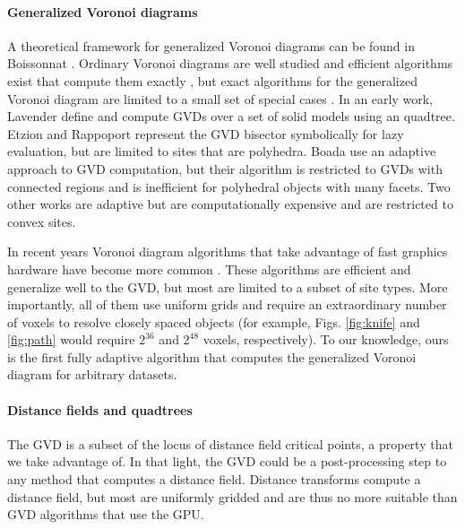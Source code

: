 \documentclass[submission]{gmp2017}
\begin{document}
\paragraph{Generalized Voronoi diagrams}
A theoretical framework for generalized Voronoi diagrams can be found in Boissonnat \etal {}. Ordinary Voronoi diagrams are well studied and efficient algorithms exist that compute them exactly \cite{de2008computational}, but exact algorithms for the generalized Voronoi diagram are limited to a small set of special cases \cite{lee1982medial,karavelas2004robust}. In an early work, Lavender \etal {} define and compute GVDs over a set of solid models using an quadtree.  Etzion and Rappoport  represent the GVD bisector symbolically for lazy evaluation, but are limited to sites that are polyhedra.  Boada \etal {} use an adaptive approach to GVD computation, but their algorithm is restricted to GVDs with connected regions and is inefficient for polyhedral objects with many facets.  Two other works are adaptive \cite{teichmann1997polygonal,vleugels1998approximating} but are computationally expensive and are restricted to convex sites.

In recent years Voronoi diagram algorithms that take advantage of fast graphics hardware have become more common \cite{cao2010parallel,fischer2006fast,hsieh2005simple,rong2007variants,sud2006interactive,sud2006fast,hoff1999fast,wu2008gpu}.  These algorithms are efficient and generalize well to the GVD, but most are limited to a subset of site types.  More importantly, all of them use uniform grids and require an extraordinary number of voxels to resolve closely spaced objects (for example, Figs. \ref{fig:knife} and \ref{fig:path} would require $2^{36}$ and $2^{48}$ voxels, respectively).  To our knowledge, ours is the first fully adaptive algorithm that computes the generalized Voronoi diagram for arbitrary datasets.

\paragraph{Distance fields and quadtrees}
The GVD is a subset of the locus of distance field critical points, a property that we take advantage of. In that light, the GVD could be a post-processing step to any method that computes a distance field.  Distance transforms compute a distance field, but most are uniformly gridded \cite{jones20063d} and are thus no more suitable than GVD algorithms that use the GPU.
\end{document}

